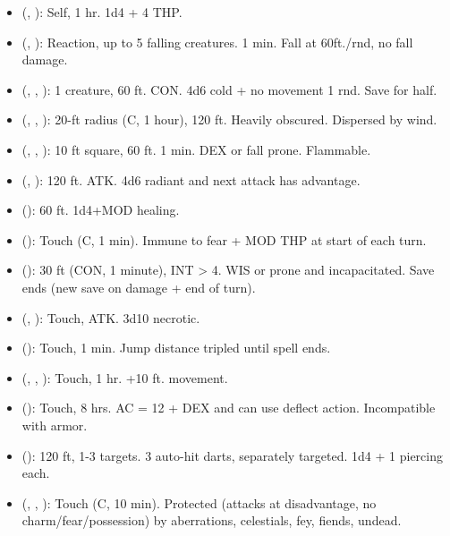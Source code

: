 \begin{itemize}
	\item {} (, ): Self, 1 hr. 1d4 + 4 THP.
	\item {} (, ): Reaction, up to 5 falling creatures. 1 min. Fall at 60ft./rnd, no fall damage.
	\item {} (, , ): 1 creature, 60 ft. CON. 4d6 cold + no movement 1 rnd. Save for half.
	\item {} (, , ): 20-ft radius (C, 1 hour), 120 ft. Heavily obscured. Dispersed by wind.
	\item {} (, , ): 10 ft square, 60 ft. 1 min. DEX or fall prone. Flammable.
	\item {} (, ): 120 ft. ATK. 4d6 radiant and next attack has advantage.
	\item {} (): 60 ft. 1d4+MOD healing.
	\item {} (): Touch (C, 1 min). Immune to fear + MOD THP at start of each turn.
	\item {} (): 30 ft (CON, 1 minute), INT > 4. WIS or prone and incapacitated. Save ends (new save on damage + end of turn).
	\item {} (, ): Touch, ATK. 3d10 necrotic.
	\item {} (): Touch, 1 min. Jump distance tripled until spell ends.
	\item {} (, , ): Touch, 1 hr. +10 ft. movement.
	\item {} (): Touch, 8 hrs. AC = 12 + DEX and can use deflect action. Incompatible with armor.
	\item {} (): 120 ft, 1-3 targets. 3 auto-hit darts, separately targeted. 1d4 + 1 piercing each.
	\item {} (, , ): Touch (C, 10 min). Protected (attacks at disadvantage, no charm/fear/possession) by aberrations, celestials, fey, fiends, undead.

\end{itemize}
